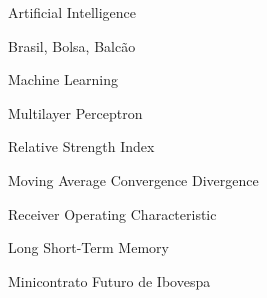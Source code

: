 \begin{siglas}
 \item[AI] Artificial Intelligence
 \item[B3] Brasil, Bolsa, Balcão
 \item[ML] Machine Learning
 \item[MLP] Multilayer Perceptron
 \item[RSI] Relative Strength Index
 \item[MACD] Moving Average Convergence Divergence
 \item[ROC] Receiver Operating Characteristic
 \item[LSTM] Long Short-Term Memory
 \item[WIN] Minicontrato Futuro de Ibovespa
\end{siglas}
